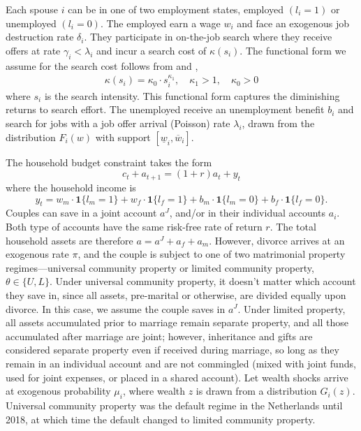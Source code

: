 \documentclass[11pt]{article}
\begin{document}
Each spouse $i$ can be in one of two employment states, employed $(l_i=1)$ or unemployed $(l_i=0)$. The employed earn a wage $w_i$ and face an exogenous job destruction rate $\delta_i$. They participate in on-the-job search where they receive offers at rate $\gamma_i<\lambda_i$ and incur a search cost of $\kappa(s_i)$. The functional form we assume for the search cost follows from \cite{10.1093/restud/rds042} and \cite{WANG2019165}, \begin{align*}
    \kappa(s_i)=\kappa_0\cdot s_i^{\kappa_1},\quad \kappa_1>1, \quad \kappa_0 >0
\end{align*} where $s_i$ is the search intensity. This functional form captures the diminishing returns to search effort. The unemployed receive an unemployment benefit $b_i$ and search for jobs with a job offer arrival (Poisson) rate $\lambda_i$, drawn from the distribution $F_i(w)$ with support $[\underline{w}_i,\overline{w}_i]$. 

The household budget constraint takes the form \begin{equation*}
    c_t+a_{t+1}=(1+r)a_t+y_t
\end{equation*} where the household income is \begin{equation*}
    y_t=w_m\cdot\mathbf{1}\{l_m=1\}+w_f\cdot\mathbf{1}\{l_f=1\}+b_m\cdot\mathbf{1}\{l_m=0\}+b_f\cdot\mathbf{1}\{l_f=0\}.
\end{equation*}
Couples can save in a joint account $a^J$, and/or in their individual accounts $a_i$. Both type of accounts have the same risk-free rate of return $r$. The total household assets are therefore $a=a^J+a_f+a_m$. However, divorce arrives at an exogenous rate $\pi$, and the couple is subject to one of two matrimonial property regimes—universal community property or limited community property, $\theta\in\{U,L\}$. Under universal community property, it doesn't matter which account they save in, since all assets, pre-marital or otherwise, are divided equally upon divorce. In this case, we assume the couple saves in $a^J$. Under limited property, all assets accumulated prior to marriage remain separate property, and all those accumulated after marriage are joint; however, inheritance and gifts are considered separate property even if received during marriage, so long as they remain in an individual account and are not commingled (mixed with joint funds, used for joint expenses, or placed in a shared account). Let wealth shocks arrive at exogenous probability $\mu_i$, where wealth $z$ is drawn from a distribution $G_i(z)$. Universal community property was the default regime in the Netherlands until 2018, at which time the default changed to limited community property. 
\end{document}
